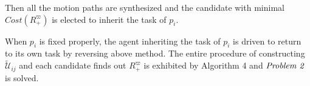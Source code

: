 \documentclass[journal]{IEEEtran}
\begin{document}
Then all the motion paths are synthesized and the candidate with minimal $Cost(R^{\varpi}_+)$ is elected to inherit the task of $p_i$.\par
When $p_i$ is fixed properly, the agent inheriting the task of $p_i$ is driven to return to its own task by reversing above method. The entire procedure of constructing $\widetilde{\mathcal{U}}_{ij}$ and each candidate finds out $R^{\varpi}_+$ is exhibited by Algorithm 4 and $\emph{Problem 2}$ is solved.
\end{document}
